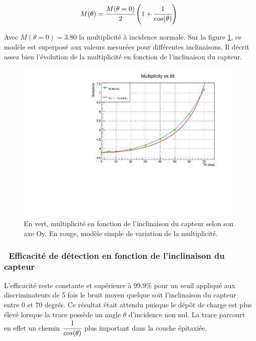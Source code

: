    \begin{equation}
    M(\theta) = \cfrac{M(\theta=0)}{2} \left( 1 + \cfrac{1}{\cos(\theta)} \right)
   \end{equation}

   Avec $M(\theta=0) = 3.80$ la multiplicit\'e \`a incidence normale. Sur la figure \ref{fig:mult_vs_tilt}, ce mod\`ele est superpos\'e aux valeurs mesur\'ees pour diff\'erentes inclinaisons. Il d\'ecrit assez bien l'\'evolution de la multiplicit\'e en fonction de l'inclinaison du capteur.
   
   \begin{figure}[!Htb]
    \begin{center} 
     \includegraphics[scale=0.65]{./figures/multiplicity_vs_tilt.pdf}
     \caption{En vert, multiplicit\'e en fonction de l'inclinaison du capteur selon son axe Oy. En rouge, mod\`ele simple de variation de la multiplicit\'e.}
    \label{fig:mult_vs_tilt}
    \end{center}
   \end{figure}
   
   \FloatBarrier
   
   \subsubsection{\ Efficacit\'e de d\'etection en fonction de l'inclinaison du capteur}

   
   L'efficacit\'e reste constante et sup\'erieure \`a $99.9\%$ pour un seuil appliqu\'e aux discriminateurs de 5 fois le bruit moyen quelque soit l'inclinaison du capteur entre 0 et $70$ degr\'es. Ce r\'esultat \'etait attendu puisque le d\'epôt de charge est plus \'elev\'e lorsque la trace poss\`ede un angle $\theta$ d'incidence non nul. La trace parcourt en effet un chemin $\cfrac{1}{cos(\theta)}$ plus important dans la couche \'epitaxi\'ee.
   
